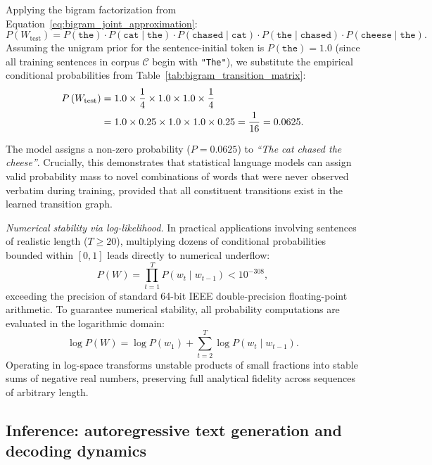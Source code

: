 \documentclass[../../../main.tex]{subfiles}
\begin{document}
Applying the bigram factorization from Equation~\eqref{eq:bigram_joint_approximation}:
\begin{equation}
P\left(W_{\text{test}}\right) = P\left(\texttt{the}\right) \cdot P\left(\texttt{cat} \mid \texttt{the}\right) \cdot P\left(\texttt{chased} \mid \texttt{cat}\right) \cdot P\left(\texttt{the} \mid \texttt{chased}\right) \cdot P\left(\texttt{cheese} \mid \texttt{the}\right).
\end{equation}
Assuming the unigram prior for the sentence-initial token is $P(\texttt{the}) = 1.0$ (since all training sentences in corpus $\mathcal{C}$ begin with \texttt{"The"}), we substitute the empirical conditional probabilities from Table~\ref{tab:bigram_transition_matrix}:
\begin{align}
P\left(W_{\text{test}}\right) &= 1.0 \times \frac{1}{4} \times 1.0 \times 1.0 \times \frac{1}{4} \notag \\
&= 1.0 \times 0.25 \times 1.0 \times 1.0 \times 0.25 = \frac{1}{16} = 0.0625.
\end{align}

The model assigns a non-zero probability ($P = 0.0625$) to \textit{``The cat chased the cheese''}. Crucially, this demonstrates that statistical language models can assign valid probability mass to novel combinations of words that were never observed verbatim during training, provided that all constituent transitions exist in the learned transition graph.

\textit{Numerical stability via log-likelihood.} In practical applications involving sentences of realistic length ($T \ge 20$), multiplying dozens of conditional probabilities bounded within $[0, 1]$ leads directly to numerical underflow:
\begin{equation}
P(W) = \prod_{t=1}^T P\left(w_t \mid w_{t-1}\right) < 10^{-308},
\end{equation}
exceeding the precision of standard 64-bit IEEE double-precision floating-point arithmetic. To guarantee numerical stability, all probability computations are evaluated in the logarithmic domain:
\begin{equation}
\log P(W) = \log P\left(w_1\right) + \sum_{t=2}^T \log P\left(w_t \mid w_{t-1}\right).
\label{eq:log_likelihood_sum}
\end{equation}
Operating in log-space transforms unstable products of small fractions into stable sums of negative real numbers, preserving full analytical fidelity across sequences of arbitrary length.

\subsection{Inference: autoregressive text generation and decoding dynamics}
\label{subsec:autoregressive_generation_dynamics}
\end{document}
